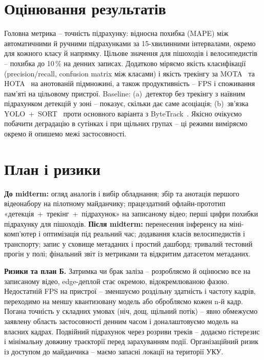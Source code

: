 \documentclass[ukrainian]{ucuproposal}
\begin{document}
\section{Оцінювання результатів}
Головна метрика – точність підрахунку: відносна похибка (MAPE) між автоматичними й
ручними підрахунками за 15-хвилинними інтервалами, окремо для кожного класу й
напрямку. Цільове значення для пішоходів і велосипедистів – похибка до 10\,\% на
денних записах. Додатково міряємо якість класифікації (precision/recall, confusion
matrix між класами) і якість трекінгу за MOTA~\cite{bernardin2008} та
HOTA~\cite{luiten2021} на анотованій підмножині, а також продуктивність – FPS і
споживання пам'яті на цільовому пристрої. Baseline: (a)~детектор без трекінгу з
наївним підрахунком детекцій у зоні – показує, скільки дає саме асоціація;
(b)~зв'язка YOLO~+~SORT~\cite{bewley2016} проти основного варіанта з
ByteTrack~\cite{zhang2022}. Якісно очікуємо побачити деградацію в сутінках і при
щільних групах – ці режими виміряємо окремо й опишемо межі застосовності.

\section{План і ризики}
\textbf{До midterm:} огляд аналогів і вибір обладнання; збір та анотація першого
відеонабору на пілотному майданчику; працездатний офлайн-прототип
«детекція~+~трекінг~+~підрахунок» на записаному відео; перші цифри похибки
підрахунку для пішоходів. \textbf{Після midterm:} перенесення інференсу на
міні-комп'ютер і оптимізація під реальний час; додавання класів велосипедистів і
транспорту; запис у сховище метаданих і простий дашборд; тривалий тестовий прогін у
полі; фінальний звіт із метриками та відкритим датасетом метаданих.

\textbf{Ризики та план Б.} Затримка чи брак заліза – розробляємо й оцінюємо все на
записаному відео, edge-деплой стає окремою, відокремлюваною фазою. Недостатній FPS
на пристрої – зменшуємо роздільну здатність і частоту кадрів, переходимо на меншу
квантизовану модель або обробляємо кожен n-й кадр. Погана точність у складних
умовах (ніч, дощ, щільний потік) – явно обмежуємо заявлену область застосовності
денним часом і доналаштовуємо модель на власних кадрах. Подвійний підрахунок через
розриви треків – додаємо гістерезис і мінімальну довжину траєкторії перед
зарахуванням події. Організаційний ризик із доступом до майданчика – маємо запасні
локації на території УКУ.
\end{document}
